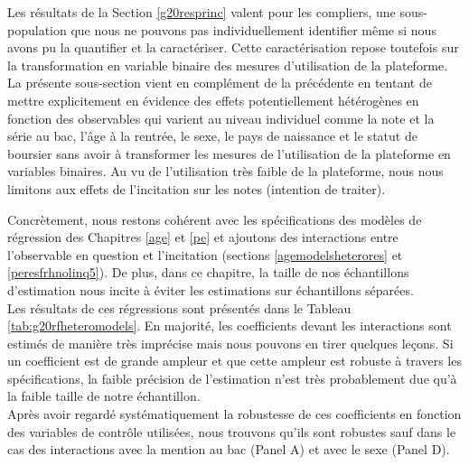 \documentclass[
]{book}
\begin{document}
Les résultats de la Section \ref{g20resprinc} valent pour les compliers, une sous-population que nous ne pouvons pas individuellement identifier même si nous avons pu la quantifier et la caractériser. Cette caractérisation repose toutefois sur la transformation en variable binaire des mesures d'utilisation de la plateforme. La présente sous-section vient en complément de la précédente en tentant de mettre explicitement en évidence des effets potentiellement hétérogènes en fonction des observables qui varient au niveau individuel comme la note et la série au bac, l'âge à la rentrée, le sexe, le pays de naissance et le statut de boursier sans avoir à transformer les mesures de l'utilisation de la plateforme en variables binaires. Au vu de l'utilisation très faible de la plateforme, nous nous limitons aux effets de l'incitation sur les notes (intention de traiter).

Concrètement, nous restons cohérent avec les spécifications des modèles de régression des Chapitres \ref{age} et \ref{pe} et ajoutons des interactions entre l'observable en question et l'incitation (sections \ref{agemodelsheterores} et \ref{peresfrhnolinq5}). De plus, dans ce chapitre, la taille de nos échantillons d'estimation nous incite à éviter les estimations sur échantillons séparées.\\
Les résultats de ces régressions sont présentés dans le Tableau \ref{tab:g20rfheteromodels}. En majorité, les coefficients devant les interactions sont estimés de manière très imprécise mais nous pouvons en tirer quelques leçons. Si un coefficient est de grande ampleur et que cette ampleur est robuste à travers les spécifications, la faible précision de l'estimation n'est très probablement due qu'à la faible taille de notre échantillon.\\
Après avoir regardé systématiquement la robustesse de ces coefficients en fonction des variables de contrôle utilisées, nous trouvons qu'ils sont robustes sauf dans le cas des interactions avec la mention au bac (Panel A) et avec le sexe (Panel D).
\end{document}

